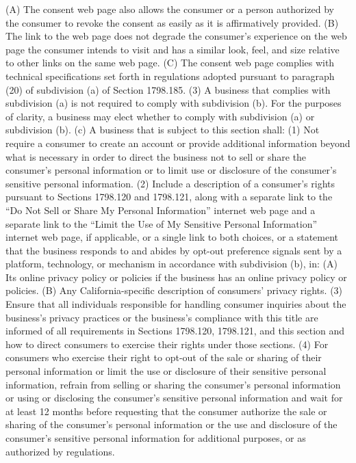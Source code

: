 (A) The consent web page also allows the consumer or a person authorized by the consumer to revoke the consent as easily as it is affirmatively provided.
(B) The link to the web page does not degrade the consumer’s experience on the web page the consumer intends to visit and has a similar look, feel, and size relative to other links on the same web page.
(C) The consent web page complies with technical specifications set forth in regulations adopted pursuant to paragraph (20) of subdivision (a) of Section 1798.185.
(3) A business that complies with subdivision (a) is not required to comply with subdivision (b). For the purposes of clarity, a business may elect whether to comply with subdivision (a) or subdivision (b).
(c) A business that is subject to this section shall:
(1) Not require a consumer to create an account or provide additional information beyond what is necessary in order to direct the business not to sell or share the consumer’s personal information or to limit use or disclosure of the consumer’s sensitive personal information.
(2) Include a description of a consumer’s rights pursuant to Sections 1798.120 and 1798.121, along with a separate link to the “Do Not Sell or Share My Personal Information” internet web page and a separate link to the “Limit the Use of My Sensitive Personal Information” internet web page, if applicable, or a single link to both choices, or a statement that the business responds to and abides by opt-out preference signals sent by a platform, technology, or mechanism in accordance with subdivision (b), in:
(A) Its online privacy policy or policies if the business has an online privacy policy or policies.
(B) Any California-specific description of consumers’ privacy rights.
(3) Ensure that all individuals responsible for handling consumer inquiries about the business’s privacy practices or the business’s compliance with this title are informed of all requirements in Sections 1798.120, 1798.121, and this section and how to direct consumers to exercise their rights under those sections.
(4) For consumers who exercise their right to opt-out of the sale or sharing of their personal information or limit the use or disclosure of their sensitive personal information, refrain from selling or sharing the consumer’s personal information or using or disclosing the consumer’s sensitive personal information and wait for at least 12 months before requesting that the consumer authorize the sale or sharing of the consumer’s personal information or the use and disclosure of the consumer’s sensitive personal information for additional purposes, or as authorized by regulations.
